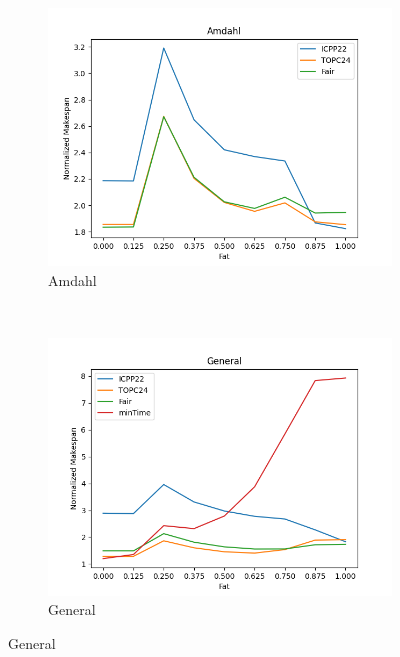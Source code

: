 \documentclass{article}
\begin{document}
\begin{figure}[htbp]
\begin{subfigure}[b]{0.32\textwidth}\includegraphics[width=\textwidth]{Results/Fat/Fat_Amdahl}\caption{Amdahl}\label{fig:lines_figures_Fat_Amdahl}\end{subfigure}
\\[2ex]
\begin{subfigure}[b]{0.32\textwidth}\includegraphics[width=\textwidth]{Results/Fat/Fat_General}\caption{General}\label{fig:lines_figures_Fat_General}\end{subfigure}
\hfill

\end{figure}
\end{document}
